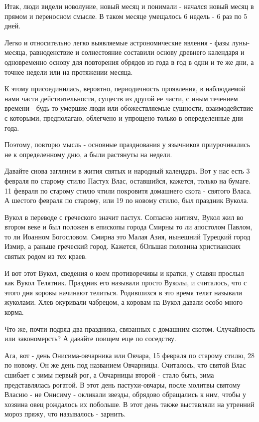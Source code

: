 \documentclass[a5paper,11pt,openany]{article}
\begin{document}
    Итак, люди видели новолуние, новый месяц и понимали - начался новый месяц в прямом и переносном смысле. В таком месяце умещалось 6 недель - 6 раз по 5 дней.

   Легко и относительно легко выявляемые астрономические явления - фазы луны-месяца, равноденствие и солнестояние составили основу древнего календаря и одновременно основу для повторения обрядов из года в год в одни и те же дни, а точнее недели или на протяжении месяца.

   К этому присоединилась, вероятно, 
периодичность проявления, в наблюдаемой нами части действительности, существ из другой ее части, с иным течением времени - будь то умершие люди или обожествляемые сущности, взаимодействие с которыми, предполагаю, облегчено и упрощено только в опеределенные дни года.

   Поэтому, повторю мысль - основные празднования у язычников приурочивались не к определенному дню, а были растянуты на недели.

   Давайте снова заглянем в жития святых и народный календарь. Вот у нас есть 3 февраля по старому стилю Пастух Влас, оставшийся, кажется, только на бумаге. 11 февраля по старому стилю чтили покровитя домашнего скота - святого Власа. А шестого февраля по старому, или 19 по новому стилю, был праздник Вукола.

   Вукол в переводе с греческого значит пастух. Согласно житиям, Вукол жил во втором веке и был положен в епископы города Смирны то ли апостолом Павлом, то ли Иоанном Богословом. Смирна это Малая Азия, нынешний Турецкий город Измир, а раньше греческий город. Кажется, бОльшая половина христианских святых родом из тех краев. 

   И вот этот Вукол, сведения о коем противоречивы и кратки, у славян прослыл как Вукол Телятник. Праздник его называли просто Вуколы, и считалось, что с этого дня коровы начинают телиться. Родившихся в это время телят называли жуколами. Хлев окуривали чабрецом, а коровам на Вукол давали особо много корма.

   Что же, почти подряд два праздника, связанных с домашним скотом. Случайность или закономерсть? А давайте поищем еще по соседству. 

   Ага, вот - день Онисима-овчарника или Овчара, 15 февраля по старому стилю, 28 по новому. Он же день под названием Овчарницы. Считалось, что святой Влас сшибает с зимы первый рог, а Овчарницы второй - стало быть, зима представлялась рогатой. В этот день пастухи-овчары, после молитвы святому Власию - не Онисиму - окликали звезды, обрядово обращались к ним, чтобы у хозяина овец рождалось их побольше. В этот день также выставляли на утренний мороз пряжу, что называлось - зарнить.
\end{document}
